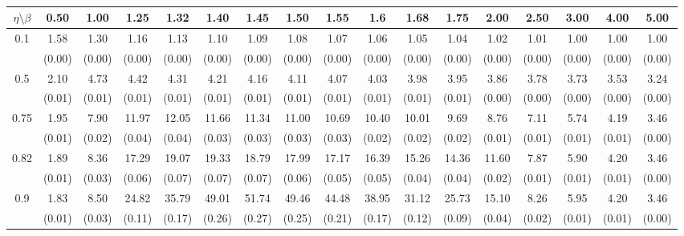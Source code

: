 \documentclass[12pt]{article}  %
\theoremstyle{plain}
\begin{document}
\begin{sidewaystable}[htbp]
\centering
{}

\ \\
\begin{tabular}{ccccccccccccccccc}
\hline
$\eta \setminus \beta $        & 0.50   & 1.00   & 1.25   & 1.32   & 1.40   & 1.45   & 1.50   & 1.55   & 1.6   & 1.68   & 1.75   & 2.00   & 2.50   & 3.00   & 4.00  &5.00 \\ \hline
\multirow{2}{*}{0.1}  & 1.58& 1.30 & 1.16  &1.13  & 1.10  & 1.09   &1.08 &  1.07 &  1.06  &1.05 & 1.04 & 1.02 & 1.01 & 1.00 & 1.00 & 1.00  \\
                      & (0.00) & (0.00) & (0.00) & (0.00) & (0.00) & (0.00) & (0.00) & (0.00) & (0.00) & (0.00) & (0.00) & (0.00) & (0.00) & (0.00) & (0.00) & (0.00)\\ \hline
\multirow{2}{*}{0.5}  & 2.10 &4.73 & 4.42 & 4.31  & 4.21  & 4.16  & 4.11  & 4.07  & 4.03 & 3.98 & 3.95 & 3.86 & 3.78 & 3.73 & 3.53 & 3.24 \\
                      & (0.01) & (0.01) & (0.01) & (0.01) & (0.01) & (0.01) & (0.01) & (0.01) & (0.01) & (0.01) & (0.01) & (0.00)  & (0.00) & (0.00) & (0.00)&(0.00)\\ \hline
\multirow{2}{*}{0.75}  & 1.95 &7.90& 11.97 &12.05 & 11.66 & 11.34  &11.00 & 10.69 & 10.40& 10.01 & 9.69 & 8.76 & 7.11 & 5.74 & 4.19 & 3.46\\
                      & (0.01)& (0.02)& (0.04)& (0.04)& (0.03)& (0.03)& (0.03)& (0.03)& (0.02)&  (0.02)&  (0.02)&  (0.01)&  (0.01)&  (0.01)&  (0.01)&     (0.00)\\ \hline
\multirow{2}{*}{0.82}  & 1.89 &8.36 &17.29 &19.07 & 19.33 & 18.79 & 17.99 & 17.17  &16.39 &15.26 &14.36 &11.60 & 7.87 & 5.90 & 4.20&  3.46\\
                      & (0.01)& (0.03)& (0.06)& (0.07)& (0.07)& (0.07)& (0.06)& (0.05)& (0.05)&  (0.04)&  (0.04)&  (0.02)&  (0.01)&  (0.01)&  (0.01)&     (0.00)\\ \hline
\multirow{2}{*}{0.9}  & 1.83& 8.50& 24.82& 35.79 & 49.01 & 51.74 & 49.46 & 44.48&  38.95& 31.12& 25.73& 15.10 & 8.26 & 5.95 & 4.20&  3.46\\
                      & (0.01)& (0.03)& (0.11)& (0.17)& (0.26)& (0.27)& (0.25)& (0.21)& (0.17)&  (0.12)&  (0.09)&  (0.04)&  (0.02)&  (0.01)&  (0.01)&     (0.00)\\ \hline                                               

\end{tabular}
\end{sidewaystable}
\end{document}
